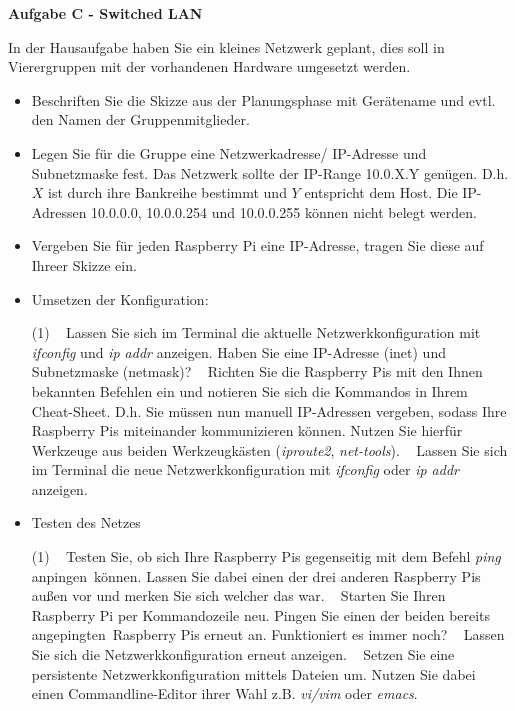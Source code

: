 \documentclass[paper=a4,fontsize=11pt]{scrartcl}%
\numberwithin{equation}{section}
\begin{document}
\begin{center}\Large{\textbf{Aufgabe C - Switched LAN}}\end{center}\vskip0.25in
In der Hausaufgabe haben Sie ein kleines Netzwerk geplant, dies soll in Vierergruppen mit der vorhandenen Hardware umgesetzt werden.
\begin{itemize}
	\item[1.)] Beschriften Sie die Skizze aus der Planungsphase mit Gerätename und evtl. den Namen der Gruppenmitglieder.
	\item[2.)] Legen Sie für die Gruppe eine Netzwerkadresse/ IP-Adresse und Subnetzmaske fest. Das Netzwerk sollte der IP-Range 10.0.X.Y genügen. D.h. $X$ ist durch ihre Bankreihe bestimmt und $Y$ entspricht dem Host. Die IP-Adressen 10.0.0.0, 10.0.0.254 und 10.0.0.255 können nicht belegt werden.
	\item[3.)] Vergeben Sie für jeden Raspberry Pi eine IP-Adresse, tragen Sie diese auf Ihreer Skizze ein.
	\item[4.)] Umsetzen der Konfiguration:
\begin{tasks}(1)
	\task~ Lassen Sie sich im Terminal die aktuelle Netzwerkkonfiguration mit \emph{ifconfig} und \emph{ip addr} anzeigen. Haben Sie eine IP-Adresse (inet) und Subnetzmaske (netmask)?
	\task~ Richten Sie die Raspberry Pis mit den Ihnen bekannten Befehlen ein und notieren Sie sich die Kommandos in Ihrem Cheat-Sheet. D.h. Sie müssen nun manuell IP-Adressen vergeben, sodass Ihre Raspberry Pis miteinander kommunizieren können. Nutzen Sie hierfür Werkzeuge aus beiden Werkzeugkästen (\emph{iproute2}, \emph{net-tools}).
	\task~ Lassen Sie sich im Terminal die neue Netzwerkkonfiguration mit \emph{ifconfig} oder \emph{ip addr} anzeigen.
\end{tasks}
\item[4.)] Testen des Netzes
\begin{tasks}(1)
	\task~ Testen Sie, ob sich Ihre Raspberry Pis gegenseitig mit dem Befehl \emph{ping} \glqq anpingen\grqq\ können. Lassen Sie dabei einen der drei anderen Raspberry Pis außen vor und merken Sie sich welcher das war.
	\task~ Starten Sie Ihren Raspberry Pi per Kommandozeile neu. Pingen Sie einen der beiden bereits \glqq angepingten\grqq\ Raspberry Pis erneut an. Funktioniert es immer noch?
	\task~ Lassen Sie sich die Netzwerkkonfiguration erneut anzeigen.
	\task~ Setzen Sie eine persistente Netzwerkkonfiguration mittels Dateien um. Nutzen Sie dabei einen Commandline-Editor ihrer Wahl z.B. \emph{vi/vim} oder \emph{emacs}.

\end{tasks}
\end{itemize}
\end{document}
